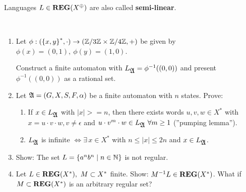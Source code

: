 Languages $L \in \mbox{{\bf REG}}(X^\oplus)$ are also called {\bf semi-linear}.

\begin{exercise}\ 

\begin{enumerate}
  \item Let $\phi : (\mbox{$\{x, y\}$}^*, \cdot) \to (\mathbb{Z} / 3 \mathbb{Z}
  \times \mathbb{Z} / 4 \mathbb{Z}, +)$ be given by $\phi(x) = (0,1),\ \phi(y) =
  (1,0)$.
  
  Construct a finite automaton  with $L_{\mbox{$\mathfrak{A}$}} = \phi^{-1}((0,0))$ and
  present $\phi^{-1}((0,0))$ as a rational set.
  
  \item Let $\mbox{$\mathfrak{A}$} = (G, X, S, F, \alpha)$ be a finite automaton with $n$
  states. Prove:
  \begin{enumerate}
    \item If $x \in L_{\mbox{$\mathfrak{A}$}}$ with $|x| >= n$, then there exists words $u, v, 
    w \in X^*$ with $x = u \cdot v \cdot w, v \neq \epsilon$ and $u \cdot v^m
    \cdot w \in L_{\mbox{$\mathfrak{A}$}}\ \forall m \geq 1$ (''pumping lemma'').
    \item $L_{\mbox{$\mathfrak{A}$}}$ is infinite $\iff \exists\, x \in X^*$ with $n
    \leq |x| \leq 2n$ and $x \in L_{\mbox{$\mathfrak{A}$}}$.
   \end {enumerate}

	\item Show: The set $L = \mbox{$\{a^n b^n \mid n \in \mathbb{N}\}$}$ is not
	regular.
	
	\item Let $L \in \mbox{{\bf REG}}(X^*),\ M \subset X^*$ finite. Show: $M^{-1}L \in
	\mbox{{\bf REG}}(X^*)$.
	What if $M \subset \mbox{{\bf REG}}(X^*)$ is an arbitrary regular set?
\end{enumerate}
\end{exercise}

